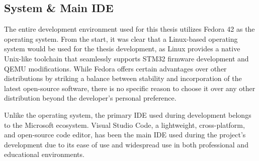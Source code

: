\subsection{System \& Main IDE}
\label{chap:back_vscode}

The entire development environment used for this thesis utilizes Fedora 42\cite{FedoraProject2026} 
\cite{Fedora42Announcement2026} as the operating system. From the start, it was clear that a Linux-based operating 
system would be used for the thesis development, as Linux provides a native 
Unix-like toolchain that seamlessly supports STM32 firmware development and QEMU 
modifications. While Fedora offers certain advantages over other distributions by 
striking a balance between stability and incorporation of the latest open-source 
software, there is no specific reason to choose it over any other distribution beyond 
the developer's personal preference.

Unlike the operating system, the primary IDE used during development belongs 
to the Microsoft ecosystem. Visual Studio Code\cite{VisualStudioCode2024}, a lightweight, cross-platform, and 
open-source code editor, has been the main IDE used during the project's development 
due to its ease of use and widespread use in both professional and educational 
environments.